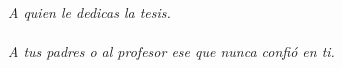 \chapter*{} %

\begin{flushright}
    \textit{A quien le dedicas la tesis. \\~\\ A tus padres o al profesor ese que nunca confió en ti. }
\end{flushright}

